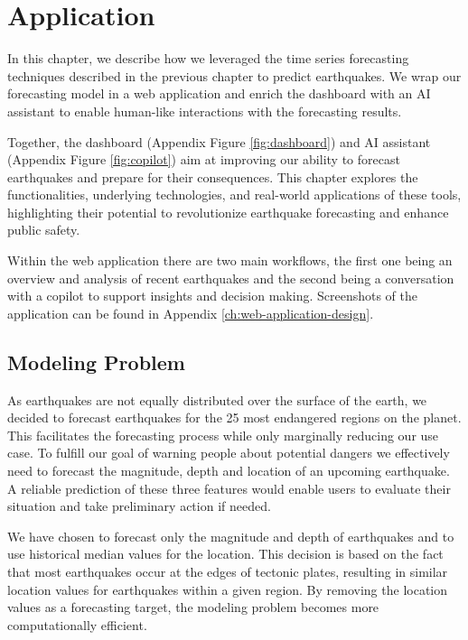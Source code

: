 \chapter{Application}
\label{ch:application}
In this chapter, we describe how we leveraged the time series forecasting techniques
described in the previous chapter to predict earthquakes. We wrap our forecasting
model in a web application and enrich the dashboard with an AI assistant
to enable human-like interactions with the forecasting results.

Together, the dashboard (Appendix Figure \ref{fig:dashboard}) and
AI assistant (Appendix Figure \ref{fig:copilot}) aim at improving our ability to forecast
earthquakes and prepare for their consequences. This chapter explores the functionalities,
underlying technologies, and real-world applications of these tools, highlighting their
potential to revolutionize earthquake forecasting and enhance public safety.

Within the web application there are two main workflows, the first one being an overview and
analysis of recent earthquakes and the second being a conversation with a copilot to
support insights and decision making. Screenshots of the application can be found in
Appendix \ref{ch:web-application-design}.

\section{Modeling Problem}

As earthquakes are not equally distributed over the surface of the earth,
we decided to forecast earthquakes for the 25 most endangered regions on
the planet. This facilitates the forecasting process while only marginally
reducing our use case. To fulfill our goal of warning people about potential
dangers we effectively need to forecast the magnitude, depth and location of
an upcoming earthquake. A reliable prediction of these three features would
enable users to evaluate their situation and take preliminary action if needed.

We have chosen to forecast only the magnitude and depth of earthquakes and
to use historical median values for the location. This decision is based
on the fact that most earthquakes occur at the edges of tectonic plates,
resulting in similar location values for earthquakes within a given region.
By removing the location values as a forecasting target, the modeling problem
becomes more computationally efficient.

